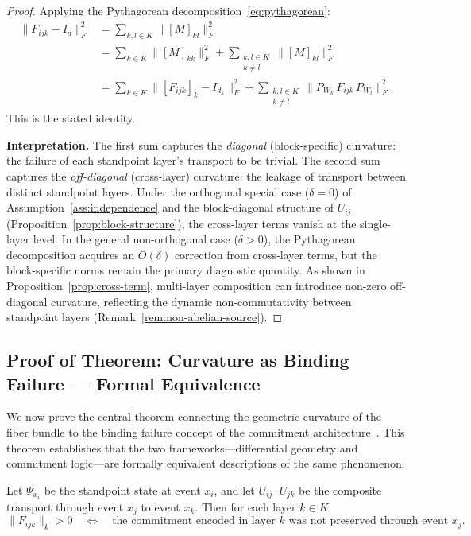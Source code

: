 \begin{proof}
Applying the Pythagorean decomposition~\eqref{eq:pythagorean}:
\begin{align*}
    \|F_{ijk} - I_d\|_F^2
    &= \sum_{k, l \in K} \|[M]_{kl}\|_F^2 \\
    &= \sum_{k \in K} \|[M]_{kk}\|_F^2 + \sum_{\substack{k, l \in K \\ k \neq l}}
       \|[M]_{kl}\|_F^2 \\
    &= \sum_{k \in K} \big\|[F_{ijk}]_k - I_{d_k}\big\|_F^2
    + \sum_{\substack{k, l \in K \\ k \neq l}} \big\|P_{W_k}\, F_{ijk}\, P_{W_l}\big\|_F^2.
\end{align*}
This is the stated identity.

\medskip\noindent\textbf{Interpretation.} The first sum captures the \emph{diagonal}
(block-specific) curvature: the failure of each standpoint layer's transport to be
trivial. The second sum captures the \emph{off-diagonal} (cross-layer) curvature: the
leakage of transport between distinct standpoint layers. Under
the orthogonal special case ($\delta = 0$) of Assumption~\ref{ass:independence} and the
block-diagonal structure of $U_{ij}$ (Proposition~\ref{prop:block-structure}), the
cross-layer terms vanish at the single-layer level. In the general non-orthogonal case
($\delta > 0$), the Pythagorean decomposition acquires an $O(\delta)$ correction from
cross-layer terms, but the block-specific norms remain the primary diagnostic quantity.
As shown in Proposition~\ref{prop:cross-term}, multi-layer composition can introduce
non-zero off-diagonal curvature, reflecting the dynamic non-commutativity between
standpoint layers (Remark~\ref{rem:non-abelian-source}).
\end{proof}

\subsection{Proof of Theorem: Curvature as Binding Failure --- Formal Equivalence}
\label{app:proof-binding-failure}

We now prove the central theorem connecting the geometric curvature of the fiber bundle to
the binding failure concept of the commitment architecture~\cite{self-jurisdiction}. This
theorem establishes that the two frameworks---differential geometry and commitment
logic---are formally equivalent descriptions of the same phenomenon.

\begin{theorem}
\label{thm:curvature-binding-app}
Let $\Psi_{x_i}$ be the standpoint state at event $x_i$, and let $U_{ij} \cdot U_{jk}$ be
the composite transport through event $x_j$ to event $x_k$. Then for each layer $k \in K$:
\[
    \|F_{ijk}\|_k > 0 \quad\Longleftrightarrow\quad \text{the commitment encoded in
    layer $k$ was not preserved through event $x_j$.}
\]
\end{theorem}


